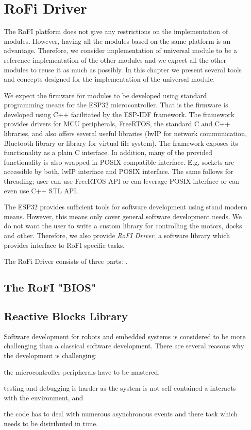 \chapter{RoFi Driver}\label{chap:software}

The RoFI platform does not give any restrictions on the implementation of
modules. However, having all the modules based on the same platform is an
advantage. Therefore, we consider implementation of universal module to be a
reference implementation of the other modules and we expect all the other
modules to reuse it as much as possibly. In this chapter we present several
tools and concepts designed for the implementation of the universal module.

We expect the firmware for modules to be developed using standard programming
means for the ESP32 microcontroller. That is the firmware is developed using C++
facilitated by the ESP-IDF \cite{noauthor_esp-idf_nodate} framework. The
framework provides drivers for MCU peripherals, FreeRTOS, the standard C and C++
libraries, and also offers several useful libraries (lwIP for network
communication, Bluetooth library or library for virtual file system). The
framework exposes its functionality as a plain C interface. In addition, many of
the provided functionality is also wrapped in POSIX-compatible interface. E.g,
sockets are accessible by both, lwIP interface and POSIX interface. The same
follows for threading; user can use FreeRTOS API or can leverage POSIX interface
or can even use C++ STL API.

The ESP32 provides sufficient tools for software development using stand modern
means. However, this means only cover general software development needs. We do
not want the user to write a custom library for controlling the motors, docks
and other. Therefore, we also provide \emph{RoFI Driver}, a software library
which provides interface to RoFI specific tasks.

The RoFi Driver consists of three parts: .

\section{The RoFI "BIOS"}

\section{Reactive Blocks Library}

Software development for robots and embedded systems is considered to be more
challenging than a classical software development. There are several reasons
why the development is challenging:
\begin{enumerate*}
    \item the microcontroller peripherals have to be mastered,
    \item testing and debugging is harder as the system is not self-contained a
    interacts with the environment, and
    \item the code has to deal with numerous asynchronous events and there task
    which needs to be distributed in time.
\end{enumerate*}

